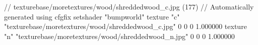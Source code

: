 // texturebase/moretextures/wood/shreddedwood_c.jpg (177)
// Automatically generated using cfgfix
setshader "bumpworld"
texture "c" "texturebase/moretextures/wood/shreddedwood_c.jpg" 0 0 0 1.000000
texture "n" "texturebase/moretextures/wood/shreddedwood_n.jpg" 0 0 0 1.000000
